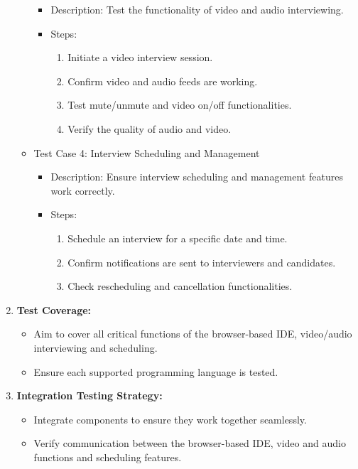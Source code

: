\documentclass{article}
\begin{document}
\begin{enumerate}
\begin{itemize}
\begin{itemize}
      \item Description: Test the functionality of video and audio interviewing.
      \item Steps: 
      \begin{enumerate}
        \item Initiate a video interview session.
        \item Confirm video and audio feeds are working.
        \item Test mute/unmute and video on/off functionalities.
        \item Verify the quality of audio and video.
      \end{enumerate}
    \end{itemize}
  \end{itemize}
  \begin{itemize}
    \item Test Case 4: Interview Scheduling and Management
    \begin{itemize}
      \item Description: Ensure interview scheduling and management features work correctly.
      \item Steps: 
      \begin{enumerate}
        \item Schedule an interview for a specific date and time.
        \item Confirm notifications are sent to interviewers and candidates.
        \item Check rescheduling and cancellation functionalities.
      \end{enumerate}
    \end{itemize}
  \end{itemize}
  \item \textbf{Test Coverage:}
  \begin{itemize}
    \item Aim to cover all critical functions of the browser-based IDE, video/audio interviewing and scheduling.
    \item Ensure each supported programming language is tested.
  \end{itemize}
  \item \textbf{Integration Testing Strategy:}
  \begin{itemize}
    \item Integrate components to ensure they work together seamlessly.
    \item Verify communication between the browser-based IDE, video and audio functions and scheduling features.

\end{itemize}
\end{enumerate}
\end{document}
